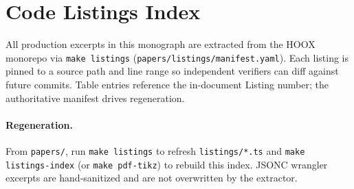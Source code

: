 \section{Code Listings Index}
\label{app:listings}

All production excerpts in this monograph are extracted from the \textsc{HOOX} monorepo via \texttt{make listings} (\texttt{papers/listings/manifest.yaml}). Each listing is pinned to a source path and line range so independent verifiers can diff against future commits. Table entries reference the in-document Listing number; the authoritative manifest drives regeneration.



\paragraph{Regeneration.} From \texttt{papers/}, run \texttt{make listings} to refresh \texttt{listings/*.ts} and \texttt{make listings-index} (or \texttt{make pdf-tikz}) to rebuild this index. JSONC wrangler excerpts are hand-sanitized and are not overwritten by the extractor.